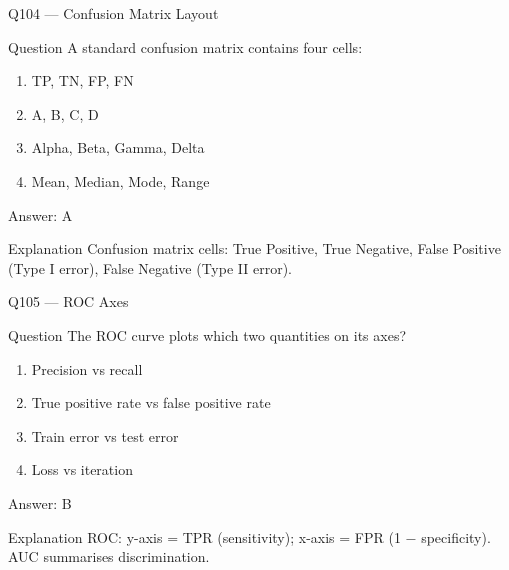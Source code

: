 \documentclass[aspectratio=169,8pt]{beamer}
\begin{document}
	\begin{frame}{Q104 --- Confusion Matrix Layout}
		\begin{block}{Question}
			A standard confusion matrix contains four cells:
			\begin{enumerate}
				\item TP, TN, FP, FN
				\item A, B, C, D
				\item Alpha, Beta, Gamma, Delta
				\item Mean, Median, Mode, Range
			\end{enumerate}
		\end{block}
		\begin{exampleblock}{Answer: A}\end{exampleblock}
		\begin{block}{Explanation}
			Confusion matrix cells: True Positive, True Negative, False Positive (Type I error), False Negative (Type II error).
		\end{block}
	\end{frame}
	
	\begin{frame}{Q105 --- ROC Axes}
		\begin{block}{Question}
			The ROC curve plots which two quantities on its axes?
			\begin{enumerate}
				\item Precision vs recall
				\item True positive rate vs false positive rate
				\item Train error vs test error
				\item Loss vs iteration
			\end{enumerate}
		\end{block}
		\begin{exampleblock}{Answer: B}\end{exampleblock}
		\begin{block}{Explanation}
			ROC: y-axis = TPR (sensitivity); x-axis = FPR (1 $-$ specificity). AUC summarises discrimination.
		\end{block}
	\end{frame}
	
\end{document}
